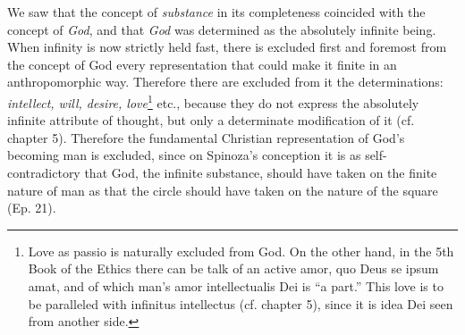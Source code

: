 \documentclass[12pt,a4paper,openany]{book}
\begin{document}
We saw that the concept of \emph{substance} in its completeness coincided
with the concept of \emph{God}, and that \emph{God} was determined as the absolutely infinite
being. When infinity is now strictly held fast, there is excluded first
and foremost from the concept of God every representation that could
make it finite in an anthropomorphic way. Therefore there are excluded
from it the determinations: \emph{intellect, will, desire, love}\footnote{Love
as passio is naturally excluded from God. On the other hand, in
the 5th Book of the Ethics there can be talk of an active amor, quo Deus se ipsum amat,
and of which man's amor intellectualis Dei is ``a part.''
This love is to be paralleled with infinitus intellectus
(cf. chapter 5), since it is idea Dei seen from another side.} etc.,
because they do not express the absolutely infinite attribute of
thought, but only a determinate modification of it (cf. chapter 5).
Therefore the fundamental Christian representation of God's becoming
man is excluded, since on Spinoza's conception it is as
self-contradictory that God, the infinite substance, should have
taken on the finite nature of man as that the circle should have
taken on the nature of the square (Ep. 21).
\end{document}
